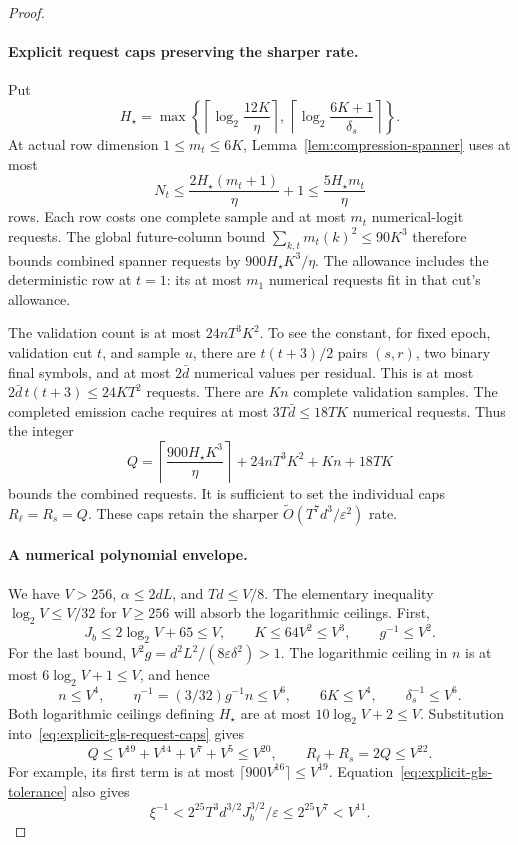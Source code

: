 \documentclass[11pt]{article}
\theoremstyle{definition}
\theoremstyle{remark}
\begin{document}
\begin{proof}
\paragraph{Explicit request caps preserving the sharper rate.}
Put
\[
H_\star=\max\left\{
\left\lceil\log_2\frac{12K}{\eta}\right\rceil,\,
\left\lceil\log_2\frac{6K+1}{\delta_s}\right\rceil
\right\}.
\]
At actual row dimension $1\le m_t\le6K$, Lemma~\ref{lem:compression-spanner} uses at most
\[
N_t\le\frac{2H_\star(m_t+1)}{\eta}+1
\le\frac{5H_\star m_t}{\eta}
\]
rows. Each row costs one complete sample and at most $m_t$ numerical-logit requests. The global future-column bound
$\sum_{k,t}m_t(k)^2\le90K^3$
therefore bounds combined spanner requests by
$900H_\star K^3/\eta$.
The allowance includes the deterministic row at $t=1$: its at most $m_1$ numerical requests fit in that cut's allowance.

The validation count is at most $24nT^3K^2$. To see the constant, for fixed epoch, validation cut $t$, and sample $u$, there are $t(t+3)/2$ pairs $(s,r)$, two binary final symbols, and at most $2\bar d$ numerical values per residual. This is at most
$2\bar d\,t(t+3)\le24KT^2$ requests. There are $Kn$ complete validation samples. The completed emission cache requires at most $3T\bar d\le18TK$ numerical requests. Thus the integer
\begin{equation}\label{eq:explicit-gls-request-caps}
Q=\left\lceil\frac{900H_\star K^3}{\eta}\right\rceil
 +24nT^3K^2+Kn+18TK
\end{equation}
bounds the combined requests. It is sufficient to set the individual caps $R_\ell=R_s=Q$. These caps retain the sharper
$\widetilde O(T^7d^3/\varepsilon^2)$ rate.

\paragraph{A numerical polynomial envelope.}
We have $V>256$, $\alpha\le2dL$, and $Td\le V/8$. The elementary inequality
$\log_2V\le V/32$ for $V\ge256$
will absorb the logarithmic ceilings. First,
\[
J_b\le2\log_2V+65\le V,\qquad
K\le64V^2\le V^3,\qquad
g^{-1}\le V^2.
\]
For the last bound, $V^2g=d^2L^2/(8\varepsilon\delta^2)>1$.
The logarithmic ceiling in $n$ is at most $6\log_2V+1\le V$, and hence
\[
n\le V^4,\qquad
\eta^{-1}=(3/32)g^{-1}n\le V^6,\qquad
6K\le V^4,\qquad \delta_s^{-1}\le V^6.
\]
Both logarithmic ceilings defining $H_\star$ are at most
$10\log_2V+2\le V$. Substitution into~\eqref{eq:explicit-gls-request-caps} gives
\[
Q\le V^{19}+V^{14}+V^7+V^5\le V^{20},
\qquad R_\ell+R_s=2Q\le V^{22}.
\]
For example, its first term is at most
$\lceil900V^{16}\rceil\le V^{19}$.
Equation~\eqref{eq:explicit-gls-tolerance} also gives
\[
\xi^{-1}<2^{25}T^3d^{3/2}J_b^{3/2}/\varepsilon
\le2^{25}V^7<V^{11}.
\]


\end{proof}
\end{document}
